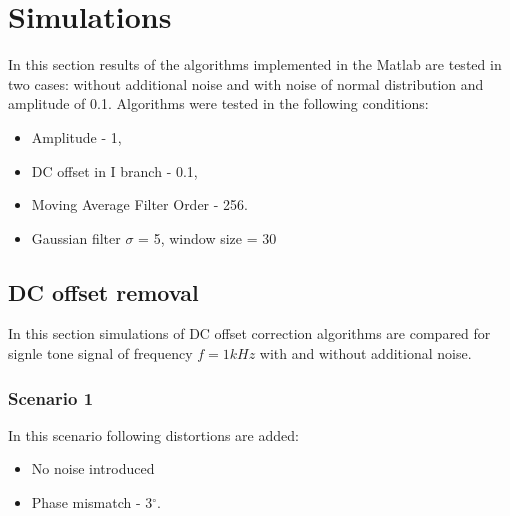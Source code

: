 \documentclass[en,printmode]{mgr}
\begin{document}
	\section{Simulations}
		In this section results of the algorithms implemented in the Matlab are
		tested in two cases: without additional noise and with noise of normal distribution and 
		amplitude of 0.1.
		Algorithms were tested in the following conditions:
		\begin{itemize}
			\item Amplitude - 1,
			\item DC offset in I branch - 0.1,
			\item Moving Average Filter Order - 256.
			\item Gaussian filter $\sigma$ = 5, window size = 30
		\end{itemize}
		\subsection*{DC offset removal}
		In this section simulations of DC offset correction algorithms are compared for signle tone
		signal of frequency $f=1kHz$ with and without additional noise.

		\subsubsection*{Scenario 1}
		In this scenario following distortions are added:
		\begin{itemize}
			\item No noise introduced
			\item Phase mismatch - 3$^\circ$.
		\end{itemize}
\end{document}
